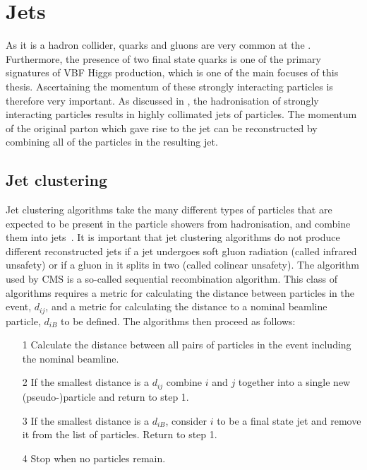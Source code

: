 \section{Jets}
\label{sec:jets}
As it is a hadron collider, quarks and gluons are very common at the \LHC. Furthermore, the presence of two final state quarks is one of the primary signatures of \ac{VBF} Higgs production, which is one of the main focuses of this thesis. Ascertaining the momentum of these strongly interacting particles is therefore very important. As discussed in , the hadronisation of strongly interacting particles results in highly collimated jets of particles. The momentum of the original parton which gave rise to the jet can be reconstructed by combining all of the particles in the resulting jet.


\subsection{Jet clustering}
\label{sec:jetclustering}
Jet clustering algorithms take the many different types of particles that are expected to be present in the particle showers from hadronisation, and combine them into jets~\cite{Salam:2009jx}. It is important that jet clustering algorithms do not produce different reconstructed jets if a jet undergoes soft gluon radiation (called infrared unsafety) or if a gluon in it splits in two (called colinear unsafety). The algorithm used by CMS is a so-called sequential recombination algorithm. This class of algorithms requires a metric for calculating the distance between particles in the event, $d_{ij}$, and a metric for calculating the distance to a nominal beamline particle, $d_{iB}$ to be defined. The algorithms then proceed as follows:
\begin{itemize}
\item[1] Calculate the distance between all pairs of particles in the event including the nominal beamline.
\item[2] If the smallest distance is a $d_{ij}$ combine $i$ and $j$ together into a single new (pseudo-)particle and return to step 1.
\item[3] If the smallest distance is a $d_{iB}$, consider $i$ to be a final state jet and remove it from the list of particles. Return to step 1.
\item[4] Stop when no particles remain.
\end{itemize}

